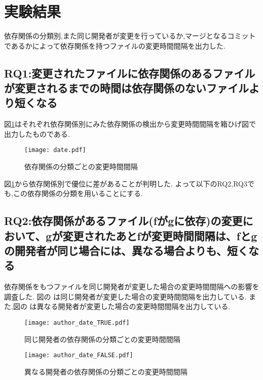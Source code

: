 \documentclass{fose2016}           %
\begin{document}
\section{実験結果}\label{実験結果}
依存関係の分類別,また同じ開発者が変更を行っているか,マージとなるコミットであるかによって依存関係を持つファイルの変更時間間隔を出力した.

\subsection{RQ1:変更されたファイルに依存関係のあるファイルが変更されるまでの時間は依存関係のないファイルより短くなる}
図\ref{fig:subdate}はそれぞれ依存関係別にみた依存関係の検出から変更時間間隔を箱ひげ図で出力したものである.　　

\begin{figure}
\centering
\texttt{[image: date.pdf]}
\caption{依存関係の分類ごとの変更時間間隔}
\label{fig:subdate} 
\end{figure}




図\ref{fig:subdate}から依存関係別で優位に差があることが判明した.
よって以下のRQ2,RQ3でも,この依存関係の分類を用いることにする.


\subsection{RQ2:依存関係があるファイル(fがgに依存)の変更において、gが変更されたあとfが変更時間間隔は、fとgの開発者が同じ場合には、異なる場合よりも、短くなる}
依存関係をもつファイルを同じ開発者が変更した場合の変更時間間隔への影響を調査した.
図の\label{fig:author_true_subdate} は同じ開発者が変更した場合の変更時間間隔を出力している.
また,図の\label{fig:author_false_subdate} は異なる開発者が変更した場合の変更時間間隔を出力している.

\begin{figure}
\centering
\begin{minipage}{0.49\columnwidth}
\centering
\texttt{[image: author\_date\_TRUE.pdf]}
\caption{同じ開発者の依存関係の分類ごとの変更時間間隔}
\label{fig:author_true_subdate} 
\end{minipage}
\begin{minipage}{0.49\columnwidth}
\centering
\texttt{[image: author\_date\_FALSE.pdf]}
\caption{異なる開発者の依存関係の分類ごとの変更時間間隔}
\label{fig:author_false_subdate} 
\end{minipage}
\end{figure}
\end{document}

